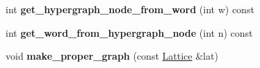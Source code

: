 \begin{DoxyCompactItemize}
\item 
\hypertarget{classForestLattice_a01fa72075f1de8421dd21e15540ce5c0}{
int {\bfseries get\_\-hypergraph\_\-node\_\-from\_\-word} (int w) const }
\label{classForestLattice_a01fa72075f1de8421dd21e15540ce5c0}

\item 
\hypertarget{classForestLattice_a226887bedd13a3f3dc5cbe91242bd17a}{
int {\bfseries get\_\-word\_\-from\_\-hypergraph\_\-node} (int n) const }
\label{classForestLattice_a226887bedd13a3f3dc5cbe91242bd17a}

\item 
\hypertarget{classForestLattice_a8f474062475f4d272a8d8b676cdd0118}{
void {\bfseries make\_\-proper\_\-graph} (const \hyperlink{classlattice_1_1Lattice}{Lattice} \&lat)}
\label{classForestLattice_a8f474062475f4d272a8d8b676cdd0118}

\end{DoxyCompactItemize}
